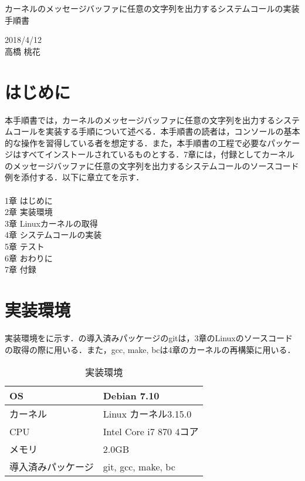 \documentclass[12pt]{jsarticle}
\begin{document}
\begin{center}
{\LARGE カーネルのメッセージバッファに任意の文字列を出力するシステムコールの実装手順書}
\end{center}

\begin{flushright}
  2018/4/12\\
  高橋 桃花
\end{flushright}
\section{はじめに}
\label{sec:introduction}
本手順書では，カーネルのメッセージバッファに任意の文字列を出力するシステムコールを実装する手順について述べる．本手順書の読者は，コンソールの基本的な操作を習得している者を想定する．また，本手順書の工程で必要なパッケージはすべてインストールされているものとする．7章には，付録としてカーネルのメッセージバッファに任意の文字列を出力するシステムコールのソースコード例を添付する．以下に章立てを示す． \\ \\
1章 はじめに \\
2章 実装環境 \\
3章 Linuxカーネルの取得 \\
4章 システムコールの実装 \\
5章 テスト \\
6章 おわりに \\
7章 付録 

\section{実装環境}
\label{sec:devenv}
実装環境をに示す．の導入済みパッケージのgitは，3章のLinuxのソースコードの取得の際に用いる．また，gcc, make, bcは4章のカーネルの再構築に用いる．

\begin{table}[h]
  \begin{center}
    \caption{実装環境}\label{tab:devenv_table}
    \begin{tabular}{l|l}
      \hline \hline
      OS & Debian 7.10 \\ \hline
      カーネル & Linux カーネル3.15.0 \\ \hline
      CPU & Intel Core i7 870 4コア\\ \hline
      メモリ & 2.0GB \\ \hline
      導入済みパッケージ & git, gcc, make, bc \\ \hline
    \end{tabular}
  \end{center}
\end{table}
\end{document}
